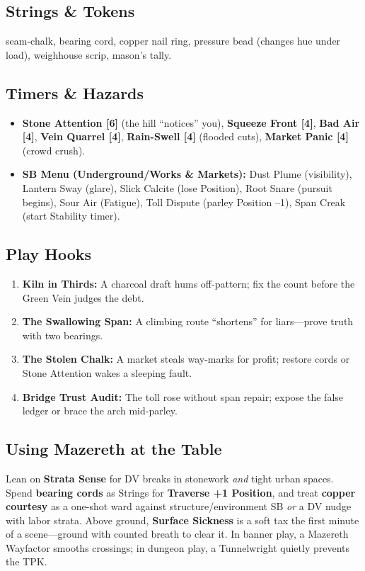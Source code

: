\documentclass[11pt,letterpaper]{article}
\begin{document}
\subsection*{Strings \& Tokens}
seam-chalk, bearing cord, copper nail ring, pressure bead (changes hue under load), weighhouse scrip, mason's tally.

\subsection*{Timers \& Hazards}
\begin{itemize}
\item \textbf{Stone Attention [6]} (the hill ``notices'' you), \textbf{Squeeze Front [4]}, \textbf{Bad Air [4]}, \textbf{Vein Quarrel [4]}, \textbf{Rain-Swell [4]} (flooded cuts), \textbf{Market Panic [4]} (crowd crush).
\item \textbf{SB Menu (Underground/Works \& Markets):} Dust Plume (visibility), Lantern Sway (glare), Slick Calcite (lose Position), Root Snare (pursuit begins), Sour Air (Fatigue), Toll Dispute (parley Position --1), Span Creak (start Stability timer).
\end{itemize}

\subsection*{Play Hooks}
\begin{enumerate}
\item \textbf{Kiln in Thirds:} A charcoal draft hums off-pattern; fix the count before the Green Vein judges the debt.
\item \textbf{The Swallowing Span:} A climbing route ``shortens'' for liars---prove truth with two bearings.
\item \textbf{The Stolen Chalk:} A market steals way-marks for profit; restore cords or Stone Attention wakes a sleeping fault.
\item \textbf{Bridge Trust Audit:} The toll rose without span repair; expose the false ledger or brace the arch mid-parley.
\end{enumerate}

\subsection*{Using Mazereth at the Table}
Lean on \textbf{Strata Sense} for DV breaks in stonework \emph{and} tight urban spaces. Spend \textbf{bearing cords} as Strings for \textbf{Traverse +1 Position}, and treat \textbf{copper courtesy} as a one-shot ward against structure/environment SB \emph{or} a DV nudge with labor strata. Above ground, \textbf{Surface Sickness} is a soft tax the first minute of a scene---ground with counted breath to clear it. In banner play, a Mazereth Wayfactor smooths crossings; in dungeon play, a Tunnelwright quietly prevents the TPK.
\end{document}
